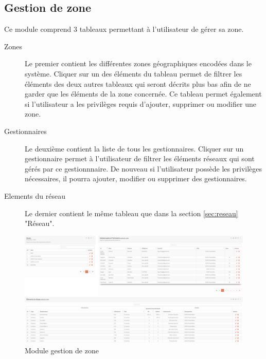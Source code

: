 \documentclass{EPL-master-thesis-covers-FR}
\begin{document}
			\subsection{Gestion de zone}
				Ce module comprend 3 tableaux permettant à l'utilisateur de gérer sa zone.
				\begin{description}
					\item[Zones] Le premier contient les différentes zones géographiques encodées dans le système. Cliquer sur un des éléments du tableau permet de filtrer les éléments des deux autres tableaux qui seront décrits plus bas afin de ne garder que les éléments de la zone concernée. Ce tableau permet également si l'utilisateur a les privilèges requis d'ajouter, supprimer ou modifier une zone.
					\item[Gestionnaires] Le deuxième contient la liste de tous les gestionnaires. Cliquer sur un gestionnaire permet à l'utilisateur de filtrer les éléments réseaux qui sont gérés par ce gestionnnaire. De nouveau si l'utilisateur possède les privilèges nécessaires, il pourra ajouter, modifier ou supprimer des gestionnaires.
					\item [Elements du réseau] Le dernier contient le même tableau que dans la section \ref{sec:reseau} "Réseau".
				\end{description}
				\begin{figure}[H]
					\centering
					\includegraphics[width=1\textwidth]{images/gestion}
					\caption{Module gestion de zone}
				\end{figure}
			
\end{document}
